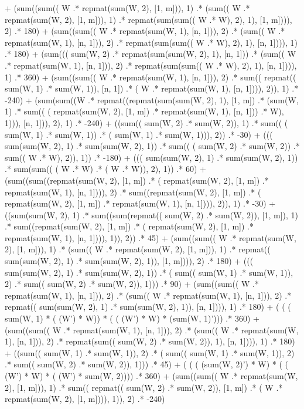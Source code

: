 \documentclass[]{article}
\begin{document}
  + (sum((sum(( W .* repmat(sum(W, 2), [1, m])), 1)  .* (sum(( W .* repmat(sum(W, 2), [1, m])), 1)  .* repmat(sum(sum(( W .* W), 2), 1), [1, m]))), 2)  .* 180) 
  + (sum((sum(( W .* repmat(sum(W, 1), [n, 1])), 2)  .* (sum(( W .* repmat(sum(W, 1), [n, 1])), 2)  .* repmat(sum(sum(( W .* W), 2), 1), [n, 1]))), 1)  .* 180) 
  + (sum((( sum(W, 2) .* repmat(sum(sum(W, 2), 1), [n, 1]))  .* (sum(( W .* repmat(sum(W, 1), [n, 1])), 2)  .* repmat(sum(sum(( W .* W), 2), 1), [n, 1]))), 1)  .* 360) 
  + (sum((sum(( W .* repmat(sum(W, 1), [n, 1])), 2)  .* sum(( repmat(( sum(W, 1) .* sum(W, 1)), [n, 1]) .* ( W .* repmat(sum(W, 1), [n, 1]))), 2)), 1)  .* -240) 
  + (sum(sum((W  .* repmat((repmat(sum(sum(W, 2), 1), [1, m])  .* (sum(W, 1)  .* sum(( ( repmat(sum(W, 2), [1, m]) .* repmat(sum(W, 1), [n, 1])) .* W), 1))), [n, 1])), 2), 1)  .* -240) 
  + ((sum(( sum(W, 2) .* sum(W, 2)), 1)  .* sum(( ( sum(W, 1) .* sum(W, 1)) .* ( sum(W, 1) .* sum(W, 1))), 2))  .* -30) 
  + ((( sum(sum(W, 2), 1) .* sum(sum(W, 2), 1))  .* sum(( ( sum(W, 2) .* sum(W, 2)) .* sum(( W .* W), 2)), 1))  .* -180) 
  + ((( sum(sum(W, 2), 1) .* sum(sum(W, 2), 1))  .* sum(sum(( ( W .* W) .* ( W .* W)), 2), 1))  .* 60) 
  + (sum((sum((repmat(sum(W, 2), [1, m])  .* ( repmat(sum(W, 2), [1, m]) .* repmat(sum(W, 1), [n, 1]))), 2)  .* sum((repmat(sum(W, 2), [1, m])  .* ( repmat(sum(W, 2), [1, m]) .* repmat(sum(W, 1), [n, 1]))), 2)), 1)  .* -30) 
  + ((sum(sum(W, 2), 1)  .* sum((sum(repmat(( sum(W, 2) .* sum(W, 2)), [1, m]), 1)  .* sum((repmat(sum(W, 2), [1, m])  .* ( repmat(sum(W, 2), [1, m]) .* repmat(sum(W, 1), [n, 1]))), 1)), 2))  .* 45) 
  + (sum((sum(( W .* repmat(sum(W, 2), [1, m])), 1)  .* (sum(( W .* repmat(sum(W, 2), [1, m])), 1)  .* repmat(( sum(sum(W, 2), 1) .* sum(sum(W, 2), 1)), [1, m]))), 2)  .* 180) 
  + ((( sum(sum(W, 2), 1) .* sum(sum(W, 2), 1))  .* ( sum(( sum(W, 1) .* sum(W, 1)), 2) .* sum(( sum(W, 2) .* sum(W, 2)), 1)))  .* 90) 
  + (sum((sum(( W .* repmat(sum(W, 1), [n, 1])), 2)  .* (sum(( W .* repmat(sum(W, 1), [n, 1])), 2)  .* repmat(( sum(sum(W, 2), 1) .* sum(sum(W, 2), 1)), [n, 1]))), 1)  .* 180) 
  + ( ( ( sum(W, 1) * ( (W') * W)) * ( ( (W') * W) * (sum(W, 1)'))) .* 360) 
  + (sum((sum(( W .* repmat(sum(W, 1), [n, 1])), 2)  .* (sum(( W .* repmat(sum(W, 1), [n, 1])), 2)  .* repmat(sum(( sum(W, 2) .* sum(W, 2)), 1), [n, 1]))), 1)  .* 180) 
  + ((sum(( sum(W, 1) .* sum(W, 1)), 2)  .* ( sum(( sum(W, 1) .* sum(W, 1)), 2) .* sum(( sum(W, 2) .* sum(W, 2)), 1)))  .* 45) 
  + ( ( ( (sum(W, 2)') * W) * ( ( (W') * W) * ( (W') * sum(W, 2)))) .* 360) 
  + (sum((sum(( W .* repmat(sum(W, 2), [1, m])), 1)  .* sum(( repmat(( sum(W, 2) .* sum(W, 2)), [1, m]) .* ( W .* repmat(sum(W, 2), [1, m]))), 1)), 2)  .* -240) 
\end{document}
